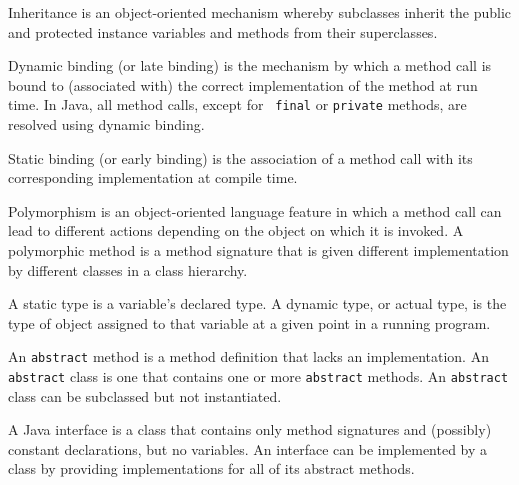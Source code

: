 \begin{SMBL}
\item Inheritance is an object-oriented mechanism whereby subclasses inherit
the public and protected instance variables and methods from their superclasses.

\item Dynamic binding (or late binding) is the mechanism by which a
method call is bound to (associated with) the correct implementation
of the method at run time. In Java, all method calls, except for {\tt
final} or {\tt private} methods, are resolved using dynamic binding.

\item Static binding (or early binding) is the association of a method
call with its corresponding implementation at compile time.

\item Polymorphism is an object-oriented language feature in which a
method call can lead to different actions depending on the object on
which it is invoked.  A polymorphic method is a method signature that
is given different implementation by different classes in a class
hierarchy.

\item A static type is a variable's declared type. A dynamic type, or actual type,
is the type of object assigned to that variable at a given point in a running program.

\item An {\tt abstract} method is a method definition that lacks an
implementation. An {\tt abstract} class is one that contains one or
more {\tt abstract} methods.  An {\tt abstract} class can be
subclassed but not instantiated.

\item A Java interface is a class that contains only method signatures and
(possibly) constant declarations, but no variables.  An interface can be
implemented by a class by providing implementations for all of its abstract
methods.

\end{SMBL}


